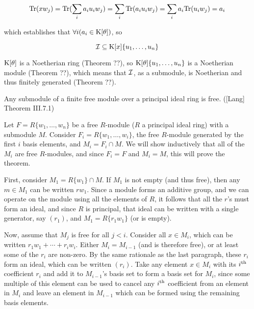 $${\rm Tr}(x w_j) = {\rm Tr}(\sum_i a_i u_i w_j)
 = \sum_i {\rm Tr}(a_i u_i w_j) %
 = \sum_i a_i {\rm Tr}(u_i w_j) %
 = a_i$$

which establishes that $\forall i (a_i \in {\rm K}[\theta])$, so

$${\cal I} \subseteq {\rm K}[x]\{u_1,\ldots,u_n\} $$

${\rm K}[\theta]$ is a Noetherian ring (Theorem ??), so ${\rm
K}[\theta]\{u_1,\ldots,u_n\}$ is a Noetherian module (Theorem ??),
which means that ${\cal I}$, as a submodule, is Noetherian
and thus finitely generated (Theorem ??).

\endtheorem


\theorem
\label{submodules of free modules over PIRs are free}

Any submodule of a finite free module over a principal ideal ring is free.
([Lang] Theorem III.7.1)

\proof

Let $F = R\{w_1,\ldots,w_n\}$ be a free $R$-module ($R$ a principal
ideal ring) with a submodule $M$.  Consider $F_i =
R\{w_1,\ldots,w_i\}$, the free $R$-module generated by the first $i$
basis elements, and $M_i = F_i \cap M$.  We will show inductively that
all of the $M_i$ are free $R$-modules, and since $F_i = F$ and $M_i =
M$, this will prove the theorem.

First, consider $M_1 = R\{w_1\} \cap M$.  If $M_1$ is not empty (and
thus free), then any $m \in M_1$ can be written $r w_1$.  Since a
module forms an additive group, and we can operate on the module using
all the elements of $R$, it follows that all the $r$'s must form an
ideal, and since $R$ is principal, that ideal can be written with a
single generator, say $(r_1)$, and $M_1 = R\{r_1 w_1\}$ (or is empty).

Now, assume that $M_j$ is free for all $j<i$.  Consider all $x \in
M_i$, which can be written $r_1 w_1 + \cdots + r_i w_i$.  Either $M_i
= M_{i-1}$ (and is therefore free), or at least some of the $r_i$ are
non-zero.  By the same rationale as the last paragraph, these $r_i$
form an ideal, which can be written $(r_i)$.  Take any element $x \in
M_i$ with its $i^{\rm th}$ coefficient $r_i$ and add it to
$M_{i-1}$'s basis set to form a basis set for $M_i$, since some
multiple of this element can be used to cancel any $i^{\rm th}$
coefficient from an element in $M_i$ and leave an element in $M_{i-1}$
which can be formed using the remaining basis elements.

